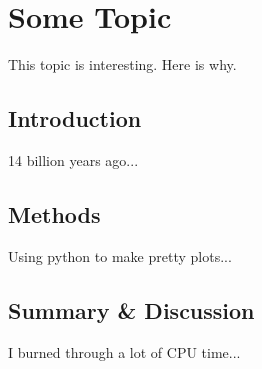 \chapter{Some Topic} \label{chap:sometopic}

\begin{chabstract}
This topic is interesting.  Here is why.
\end{chabstract}

\section{Introduction}

14 billion years ago...


\section{Methods}

Using python to make pretty plots...


\section{Summary \& Discussion}

I burned through a lot of CPU time...


\newpage
